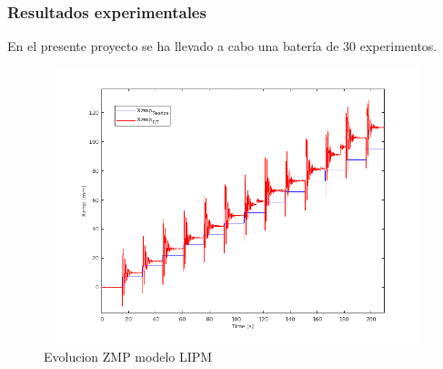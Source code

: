 \subsubsection{Resultados experimentales}

En el presente proyecto se ha llevado a cabo una batería de 30 experimentos.

\begin{figure}[H]
\centering
\includegraphics[width=13cm, height=8cm]{imagenes/apartado_5/5.1/53_evolucion_zmp_lipm}
\caption{Evolucion ZMP modelo LIPM}
\label{figura53}
\end{figure}

